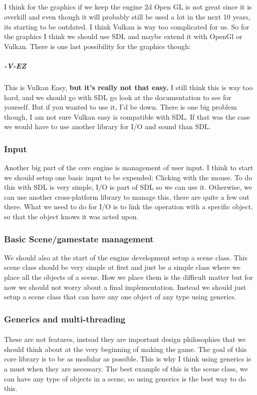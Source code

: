 \documentclass{article}
\begin{document}
	\subparagraph{}
	I think for the graphics if we keep the engine 2d Open GL is not great since it is overkill and even though it will probably still be used a lot in the next 10 years, its starting to be outdated. I think Vulkan is way too complicated for us. So for the graphics I think we should use SDL and maybe extend it with OpenGl or Vulkan. There is one last possibility for the graphics though:
	\subparagraph{-V-EZ}
	This is Vulkan Easy, \textbf{but it's really not that easy.} I still think this is way too hard, and we should go with SDL go look at the documentation to see for yourself. But if you wanted to use it, I'd be down. There is one big problem though, I am not sure Vulkan easy is compatible with SDL. If that was the case we would have to use another library for I/O and sound than SDL.
	\subsubsection{Input}
	Another big part of the core engine is management of user input. I think to start we should setup one basic input to be expended: Clicking with the mouse.
	To do this with SDL is very simple, I/O is part of SDL so we can use it. Otherwise, we can use another cross-platform library to manage this, there are quite a few out there. What we need to do for I/O is to link the operation with a specific object, so that the object knows it was acted upon.
	\subsubsection{Basic Scene/gamestate management}
	We should also at the start of the engine development setup a scene class.
	This scene class should be very simple at first and just be a simple class where we place all the objects of a scene. How we place them is the difficult matter but for now we should not worry about a final implementation. Instead we should just setup a scene class that can have any one object of any type using generics.
	\subsubsection{Generics and multi-threading}
	\paragraph{}
	 These are not features, instead they are important design philosophies that we should think about at the very beginning of making the game. The goal of this core library is to be as modular as possible. This is why I think using generics is a must when they are necessary. The best example of this is the scene class, we can have any type of objects in a scene, so using generics is the best way to do this.
\end{document}
